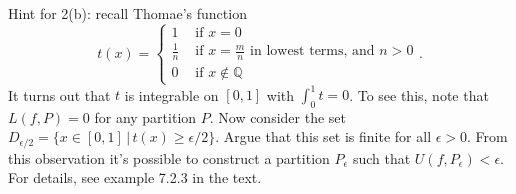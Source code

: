 \documentclass[letterpaper,12pt]{article}
\newcommand{\Q}{\mathbb{Q}}
\begin{document}
Hint for 2(b): recall Thomae's function 
\[
 t(x) = \begin{cases} 1 & \text{ if } x=0\\ \frac{1}{n} & \text{ if } x=\frac{m}{n} \text{ in lowest terms, and } n>0\\ 0 & \text{ if } x\notin\Q\end{cases}.
\]
It turns out that $t$ is integrable on $[0,1]$ with $\int_0^1 t = 0$. To see this, note that $L(f,P)=0$ for any partition $P$. Now consider the set $D_{\epsilon/2} = \{x\in [0,1]\, |\, t(x)\geq \epsilon/2\}$. Argue that this set is finite for all $\epsilon>0$. From this observation it's possible to construct a partition $P_\epsilon$ such that $U(f,P_\epsilon)<\epsilon$. For details, see example 7.2.3 in the text.
\end{document}
